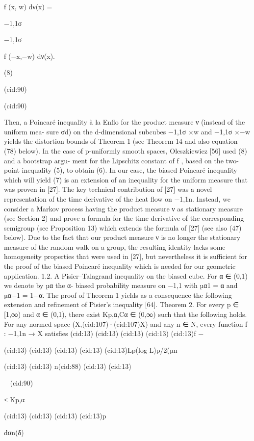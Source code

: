 f (x, w) dν(x) =

{−1,1}σ

{−1,1}σ

f (−x,−w) dν(x).

(8)

(cid:90)

(cid:90)

Then, a Poincaré inequality à la Enﬂo for the product measure ν (instead of the uniform mea-
sure σd) on the d-dimensional subcubes {−1,1}σ ×{w} and {−1,1}σ ×{−w} yields the distortion
bounds of Theorem 1 (see Theorem 14 and also equation (78) below).
In the case of p-uniformly smooth spaces, Oleszkiewicz [56] used (8) and a bootstrap argu-
ment for the Lipschitz constant of f , based on the two-point inequality (5), to obtain (6). In
our case, the biased Poincaré inequality which will yield (7) is an extension of an inequality
for the uniform measure that was proven in [27]. The key technical contribution of [27] was a
novel representation of the time derivative of the heat ﬂow on {−1,1}n. Instead, we consider a
Markov process having the product measure ν as stationary measure (see Section 2) and prove
a formula for the time derivative of the corresponding semigroup (see Proposition 13) which
extends the formula of [27] (see also (47) below). Due to the fact that our product measure
ν is no longer the stationary measure of the random walk on a group, the resulting identity
lacks some homogeneity properties that were used in [27], but nevertheless it is suﬃcient for
the proof of the biased Poincaré inequality which is needed for our geometric application.
1.2. A Pisier–Talagrand inequality on the biased cube. For α ∈ (0,1) we denote by µα the α-
biased probability measure on {−1,1} with µα{1} = α and µα{−1} = 1−α. The proof of Theorem
1 yields as a consequence the following extension and reﬁnement of Pisier’s inequality [64].
Theorem 2. For every p ∈ [1,∞) and α ∈ (0,1), there exist Kp,α,Cα ∈ (0,∞) such that the following
holds. For any normed space (X,(cid:107)·(cid:107)X) and any n ∈ N, every function f : {−1,1}n → X satisﬁes
(cid:13)
(cid:13)
(cid:13)
(cid:13)
(cid:13)f −

(cid:13)
(cid:13)
(cid:13)
(cid:13)
(cid:13)Lp(log L)p/2(µn

(cid:13)
(cid:13) n(cid:88)
(cid:13)
(cid:13)


(cid:90)






≤ Kp,α

(cid:13)
(cid:13)
(cid:13)
(cid:13)p

dσn(δ)

